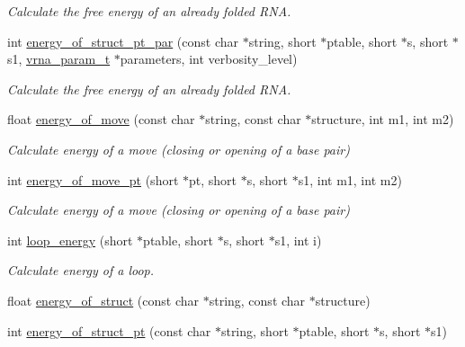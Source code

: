 \begin{DoxyCompactItemize}
\begin{DoxyCompactList}\small\item\em Calculate the free energy of an already folded R\+NA. \end{DoxyCompactList}\item 
int \hyperlink{group__eval__deprecated_ga49acb3d5627dc6823a7ce12d116d4c69}{energy\+\_\+of\+\_\+struct\+\_\+pt\+\_\+par} (const char $\ast$string, short $\ast$ptable, short $\ast$s, short $\ast$s1, \hyperlink{group__energy__parameters_ga8a69ca7d787e4fd6079914f5343a1f35}{vrna\+\_\+param\+\_\+t} $\ast$parameters, int verbosity\+\_\+level)
\begin{DoxyCompactList}\small\item\em Calculate the free energy of an already folded R\+NA. \end{DoxyCompactList}\item 
float \hyperlink{group__eval__deprecated_ga539ecaed89730f7644c202f304d7529b}{energy\+\_\+of\+\_\+move} (const char $\ast$string, const char $\ast$structure, int m1, int m2)
\begin{DoxyCompactList}\small\item\em Calculate energy of a move (closing or opening of a base pair) \end{DoxyCompactList}\item 
int \hyperlink{group__eval__deprecated_ga49e0ee561be69faf0568213546f6a53f}{energy\+\_\+of\+\_\+move\+\_\+pt} (short $\ast$pt, short $\ast$s, short $\ast$s1, int m1, int m2)
\begin{DoxyCompactList}\small\item\em Calculate energy of a move (closing or opening of a base pair) \end{DoxyCompactList}\item 
int \hyperlink{group__eval__deprecated_ga507d4fd93f4b398d793ba2402731388d}{loop\+\_\+energy} (short $\ast$ptable, short $\ast$s, short $\ast$s1, int i)
\begin{DoxyCompactList}\small\item\em Calculate energy of a loop. \end{DoxyCompactList}\item 
float \hyperlink{group__eval__deprecated_gac2b37fea2145c94d925a3f33378ef87b}{energy\+\_\+of\+\_\+struct} (const char $\ast$string, const char $\ast$structure)
\item 
int \hyperlink{group__eval__deprecated_ga27ce6f68512d43bf1fe14a06c9d76d5c}{energy\+\_\+of\+\_\+struct\+\_\+pt} (const char $\ast$string, short $\ast$ptable, short $\ast$s, short $\ast$s1)

\end{DoxyCompactItemize}
